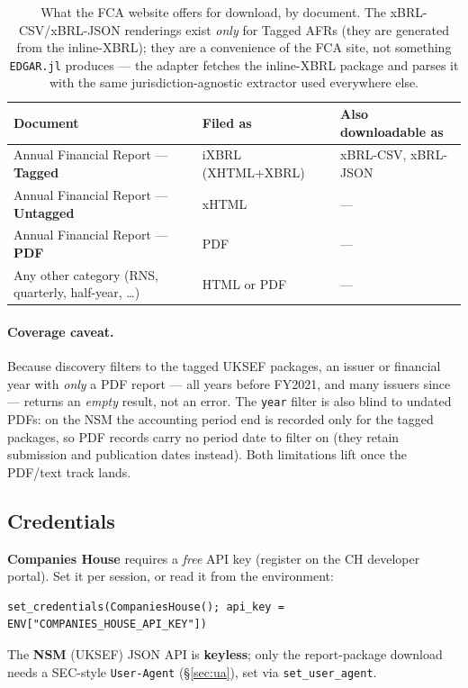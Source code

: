 \documentclass[11pt,a4paper]{report}
\begin{document}
\begin{table}[h]
\centering
\caption{What the FCA website offers for download, by document. The xBRL-CSV/xBRL-JSON renderings exist
\emph{only} for Tagged AFRs (they are generated from the inline-XBRL); they are a convenience of the FCA
site, not something \texttt{EDGAR.jl} produces --- the adapter fetches the inline-XBRL package and parses
it with the same jurisdiction-agnostic extractor used everywhere else.}
\label{tab:nsm-downloads}
\small
\begin{tabular}{@{}p{}p{}p{}@{}}
\toprule
\textbf{Document} & \textbf{Filed as} & \textbf{Also downloadable as} \\
\midrule
Annual Financial Report --- \textbf{Tagged}   & iXBRL (XHTML+XBRL) & xBRL-CSV, xBRL-JSON \\
Annual Financial Report --- \textbf{Untagged} & xHTML              & --- \\
Annual Financial Report --- \textbf{PDF}      & PDF                & --- \\
Any other category (RNS, quarterly, half-year, \ldots) & HTML or PDF & --- \\
\bottomrule
\end{tabular}
\end{table}

\paragraph{Coverage caveat.} Because discovery filters to the tagged UKSEF packages, an issuer or
financial year with \emph{only} a PDF report --- all years before FY2021, and many issuers since ---
returns an \emph{empty} result, not an error. The \texttt{year} filter is also blind to undated PDFs:
on the NSM the accounting period end is recorded only for the tagged packages, so PDF records carry no
period date to filter on (they retain submission and publication dates instead). Both limitations lift
once the PDF/text track lands.

\begin{subappendices}
\section{Credentials}\label{sec:uk-credentials}

\textbf{Companies House} requires a \emph{free} API key (register on the CH developer portal). Set it per
session, or read it from the environment:

\begin{lstlisting}
set_credentials(CompaniesHouse(); api_key = ENV["COMPANIES_HOUSE_API_KEY"])
\end{lstlisting}

\noindent The \textbf{NSM} (UKSEF) JSON API is \textbf{keyless}; only the report-package download needs a
SEC-style \texttt{User-Agent} (\S\ref{sec:ua}), set via \texttt{set\_user\_agent}.
\end{subappendices}
\end{document}
